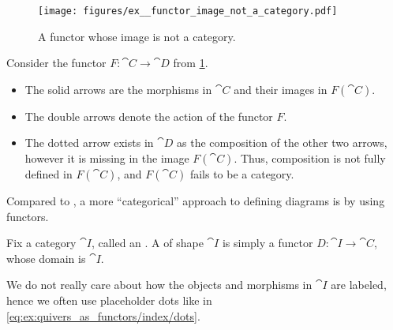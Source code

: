 \begin{example}\label{ex:functor_image_not_a_category}
  \begin{figure}
    \hfill
    \texttt{[image: figures/ex\_\_functor\_image\_not\_a\_category.pdf]}
    \hfill
    \hfill
    \caption{A functor whose image is not a category.}\label{fig:ex:functor_image_not_a_category}
  \end{figure}

  Consider the functor \( F: \cat{C} \to \cat{D} \) from \cref{fig:ex:functor_image_not_a_category}.

  \begin{itemize}
    \item The solid arrows are the morphisms in \( \cat{C} \) and their images in \( F(\cat{C}) \).
    \item The double arrows denote the action of the functor \( F \).
    \item The dotted arrow exists in \( \cat{D} \) as the composition of the other two arrows, however it is missing in the image \( F(\cat{C}) \). Thus, composition is not fully defined in \( F(\cat{C}) \), and \( F(\cat{C}) \) fails to be a category.
  \end{itemize}
\end{example}

\begin{remark}\label{rem:categorical_diagram_as_functor}
  Compared to , a more \enquote{categorical} approach to defining diagrams is by using functors.

  Fix a category \( \cat{I} \), called an . A  of shape \( \cat{I} \) is simply a functor \( D: \cat{I} \to \cat{C} \), whose domain is \( \cat{I} \).

  We do not really care about how the objects and morphisms in \( \cat{I} \) are labeled, hence we often use placeholder dots like in \eqref{eq:ex:quivers_as_functors/index/dots}.
\end{remark}

